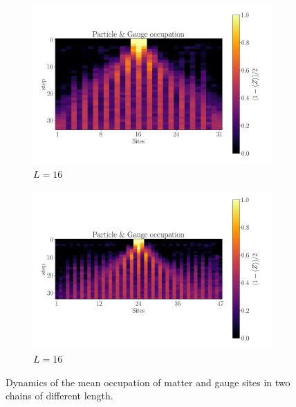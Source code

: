 \documentclass[a4paper]{article}
\begin{document}
\begin{figure}[!ht]
    \centering
    \begin{subfigure}[l]{0.4\textwidth}
        \centering
        \includegraphics[width=\textwidth]{Results figs/hardware_z2pairquench_maxt_8_steps_35_L_16_J_1.0000_h_0.0500_lamb_0.7000_g_None_pp_7_pl_1_zne_True_linear_1-1.2-1.5_mm_True_dc_XY4_pt_True_xbasis_False.png}
        \caption{$L = 16$}
    \end{subfigure}
    \begin{subfigure}[l]{0.58\textwidth}
        \centering
        \includegraphics[width=\textwidth]{Results figs/hardware_z2pairquench_maxt_8_steps_35_L_24_J_1.0000_h_0.0500_lamb_0.7000_g_None_pp_11_pl_1_zne_True_linear_1-1.2-1.5_mm_True_dc_XY4_pt_True_xbasis_False.png}
        \caption{$L = 16$}
    \end{subfigure}
    \caption{Dynamics of the mean occupation of matter and gauge sites in two chains of different length.}
\end{figure}

\printbibliography
\end{document}
